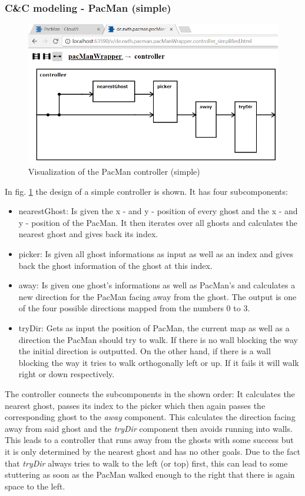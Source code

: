 \subsubsection{C\&C modeling - PacMan (simple)}
\begin{figure}
	\label{fig:visPacmanSimple}
	\centering
	\includegraphics[scale=0.7]{pictures/VisualizationPacManSimple.png}
	\caption{Visualization of the PacMan controller (simple)}
\end{figure}
In fig. \ref{fig:visPacmanSimple} the design of a simple controller is shown. It has four subcomponents:
\begin{itemize}
	\item nearestGhost: Is given the x - and y - position of every ghost and the x - and y - position of the PacMan. It then iterates over all ghosts and calculates the nearest ghost and gives back its index.
	\item picker: Is given all ghost informations as input as well as an index and gives back the ghost information of the ghost at this index.
	\item away: Is given one ghost's informations as well as PacMan's and calculates a new direction for the PacMan facing away from the ghost. The output is one of the four possible directions mapped from the numbers 0 to 3.
	\item tryDir: Gets as input the position of PacMan, the current map as well as a direction the PacMan should try to walk. If there is no wall blocking the way the initial direction is outputted. On the other hand, if there is a wall blocking the way it tries to walk orthogonally left or up. If it fails it will walk right or down respectively.
\end{itemize}
The controller connects the subcomponents in the shown order: It calculates the nearest ghost, passes its index to the picker which then again passes the corresponding ghost to the \textit{away} component. This calculates the direction facing away from said ghost and the \textit{tryDir} component then avoids running into walls. This leads to a controller that runs away from the ghosts with some success but it is only determined by the nearest ghost and has no other goals. Due to the fact that \textit{tryDir} always tries to walk to the left (or top) first, this can lead to some stuttering as soon as the PacMan walked enough to the right that there is again space to the left. \newline
